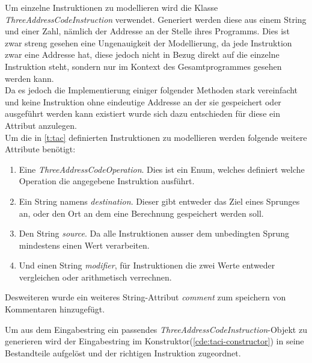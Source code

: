 Um einzelne Instruktionen zu modellieren wird die Klasse 
\textit{ThreeAddressCodeInstruction} verwendet.
Generiert werden diese aus einem String und einer Zahl, nämlich der
Addresse an der Stelle ihres Programms.
Dies ist zwar streng gesehen eine Ungenauigkeit der Modellierung, 
da jede Instruktion zwar eine Addresse hat, 
diese jedoch nicht in Bezug direkt auf die einzelne Instruktion steht,
sondern nur im Kontext des Gesamtprogrammes gesehen werden kann.\\
Da es jedoch die Implementierung einiger folgender Methoden stark vereinfacht
und keine Instruktion ohne eindeutige Addresse an der sie gespeichert oder ausgeführt werden kann
existiert wurde sich dazu entschieden für diese ein Attribut anzulegen.\\

Um die in \cref{t:tac} definierten Instruktionen zu modellieren werden folgende
weitere Attribute benötigt:
\begin{enumerate}
  \item Eine \textit{ThreeAddressCodeOperation}. Dies ist ein Enum, welches definiert
    welche Operation die angegebene Instruktion ausführt.
  \item Ein String namens \textit{destination}. Dieser gibt entweder das Ziel eines Sprunges an,
    oder den Ort an dem eine Berechnung gespeichert werden soll.
  \item Den String \textit{source}. Da alle Instruktionen ausser dem unbedingten Sprung
    mindestens einen Wert verarbeiten.
  \item Und einen String \textit{modifier}, für Instruktionen die zwei Werte
    entweder vergleichen oder arithmetisch verrechnen.
\end{enumerate}
Desweiteren wurde ein weiteres String-Attribut \textit{comment} zum speichern von Kommentaren
hinzugefügt.

Um aus dem Eingabestring ein passendes \textit{ThreeAddressCodeInstruction}-Objekt
zu generieren wird der Eingabestring im Konstruktor(\cref{cde:taci-constructor})
in seine Bestandteile aufgelöst und der richtigen Instruktion zugeordnet.


